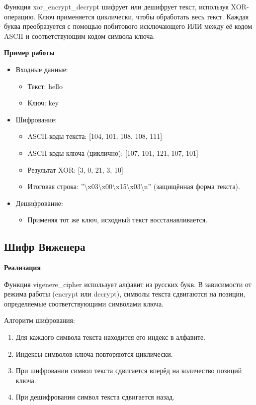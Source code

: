 \documentclass[a4paper, 12pt]{article}
\begin{document}
Функция xor\_encrypt\_decrypt шифрует или дешифрует текст, используя XOR-операцию. Ключ применяется циклически, чтобы обработать весь текст. Каждая буква преобразуется с помощью побитового исключающего ИЛИ между её кодом ASCII и соответствующим кодом символа ключа.

\textbf{Пример работы}
\begin{itemize}
    \item Входные данные:
    \begin{itemize}
        \item Текст: hello
        \item Ключ: key
    \end{itemize}
    \item Шифрование:
    \begin{itemize}
        \item ASCII-коды текста: [104, 101, 108, 108, 111]
        \item ASCII-коды ключа (циклично): [107, 101, 121, 107, 101]
        \item Результат XOR: [3, 0, 21, 3, 10]
        \item Итоговая строка: ''\textbackslash x03\textbackslash x00\textbackslash x15\textbackslash x03\textbackslash n'' (защищённая форма текста).
    \end{itemize}
    \item Дешифрование:
    \begin{itemize}
        \item Применяя тот же ключ, исходный текст восстанавливается.
    \end{itemize}
\end{itemize}

\subsection{Шифр Виженера}

\textbf{Реализация}

Функция vigenere\_cipher использует алфавит из русских букв. В зависимости от режима работы (encrypt или decrypt), символы текста сдвигаются на позиции, определяемые соответствующими символами ключа.

Алгоритм шифрования:
\begin{enumerate}
    \item Для каждого символа текста находится его индекс в алфавите.
    \item Индексы символов ключа повторяются циклически.
    \item При шифровании символ текста сдвигается вперёд на количество позиций ключа.
    \item При дешифровании символ текста сдвигается назад.
\end{enumerate}
\end{document}
